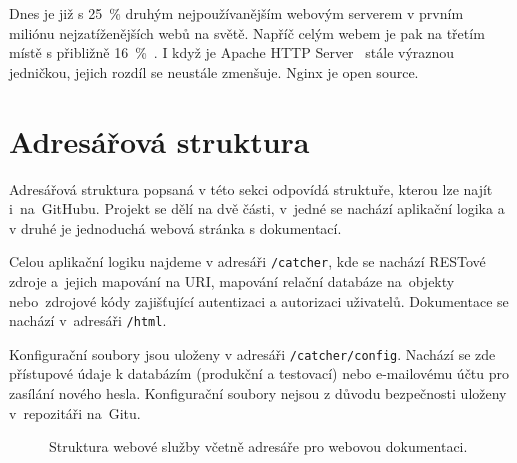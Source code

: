 Dnes je již s 25~\% druhým nejpoužívanějším webovým serverem v prvním miliónu nejzatíženějších webů na světě.
Napříč celým webem je pak na třetím místě s přibližně 16~\%~\cite{nginx_statistic}.
I když je Apache HTTP Server~\cite{apache} stále výraznou jedničkou, jejich rozdíl se neustále zmenšuje. Nginx je open source.


\section{Adresářová struktura}

Adresářová struktura popsaná v této sekci odpovídá struktuře, kterou lze najít i~na~GitHubu.
Projekt se dělí na dvě části, v~jedné se nachází aplikační logika a v druhé je jednoduchá webová stránka s dokumentací.

Celou aplikační logiku najdeme v adresáři \texttt{/catcher}, kde se nachází REST\-ové zdroje a~jejich mapování na URI,
mapování relační databáze na~objekty nebo~zdrojové kódy zajišťující autentizaci a autorizaci uživatelů.
Dokumentace se nachází v~adresáři \texttt{/html}.

Konfigurační soubory jsou uloženy v adresáři \texttt{/catcher/config}.
Nachází se zde přístupové údaje k databázím (produkční a testovací) nebo e-mailovému účtu pro zasílání nového hesla.
Konfigurační soubory nejsou z důvodu bezpečnosti uloženy v~repozitáři na~Gitu. 

\begin{figure}[ht!]
\caption{Struktura webové služby včetně adresáře pro webovou dokumentaci.\label{overflow}}
\end{figure}

